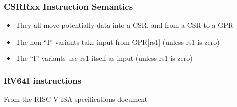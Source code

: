 
\begin{frame}
\frametitle{CSRRxx Instruction Semantics}

\begin{center}
\end{center}

{\footnotesize
\begin{itemize}
\item They all move potentially data into a CSR, and from a CSR to a GPR
\item The non ``I'' variants take input from GPR[rs1] (unless rs1 is zero)
\item The ``I'' variants use rs1 itself as input (unless rs1 is zero)
\end{itemize}}

\end{frame}


\begin{frame}
\frametitle{RV64I instructions}

From the RISC-V ISA specifications document

\vspace{1ex}

\begin{center}
\end{center}

\end{frame}



